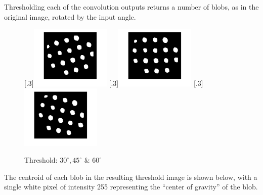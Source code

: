 \documentclass[a4paper]{article}
\begin{document}
	\par Thresholding each of the convolution outputs returns a number of
	blobs, as in the original image, rotated by the input angle.
	\begin{figure}[H]
		\centering
		[.3\linewidth]{\includegraphics[height=3cm]{Results/Q3/a/qaThresh30.jpg}}%
		[.3\linewidth]{\includegraphics[height=3cm]{Results/Q3/a/qaThresh45.jpg}}%
		[.3\linewidth]{\includegraphics[height=3cm]{Results/Q3/a/qaThresh60.jpg}}%
		\caption{Threshold: $30^\circ, 45^\circ$ \& $60^\circ$}
		\label{fig:}
	\end{figure}
	\par The centroid of each blob in the resulting threshold image is shown
	below, with a single white pixel of intensity 255 representing the
	``center of gravity'' of the blob.
\end{document}
